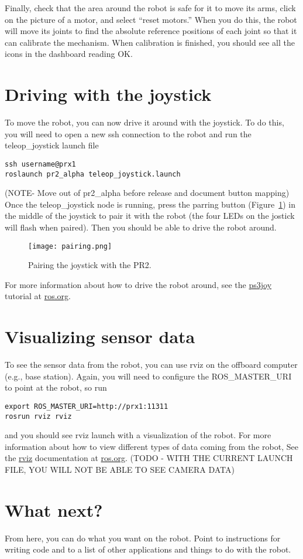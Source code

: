 Finally, check that the area around the robot is safe for it to move its arms, click on the picture of a motor, and select ``reset motors.''  When you do this, the robot will move its joints to find the absolute reference positions of each joint so that it can calibrate the mechanism.  When calibration is finished, you should see all the icons in the dashboard reading OK.
\section{Driving with the joystick}
To move the robot, you can now drive it around with the joystick.  To do this, you will need to open a new ssh connection to the robot and run the teleop\_joystick launch file
\begin{verbatim}
ssh username@prx1
roslaunch pr2_alpha teleop_joystick.launch 
\end{verbatim}
(NOTE- Move out of pr2\_alpha before release and document button mapping)
Once the teleop\_joystick node is running, press the parring button (Figure~\ref{fig:pairing}) in the middle of the joystick to pair it with the robot (the four LEDs on the jostick will flash when paired). Then you should be able to drive the robot around.
\begin{figure}[H]
\centering
\texttt{[image: pairing.png]}
\caption{Pairing the joystick with the PR2.}
\label{fig:pairing}
\end{figure}
For more information about how to drive the robot around, see the 
\href{http://www.ros.org/wiki/ps3joy/Tutorials/UsingJoystickWithPR2}{ps3joy} tutorial at \href{http://www.ros.org}{ros.org}. 

\section{Visualizing sensor data}
To see the sensor data from the robot, you can use rviz on the offboard computer (e.g., base station).  Again, you will need to configure the ROS\_MASTER\_URI to point at the robot, so run
\begin{verbatim}
export ROS_MASTER_URI=http://prx1:11311
rosrun rviz rviz
\end{verbatim}
and you should see rviz launch with a visualization of the robot.  For more information about how to view different types of data coming from the robot, See the \href{http://ros.org/wiki/rviz}{rviz} documentation at \href{http://www.ros.org}{ros.org}.
(TODO - WITH THE CURRENT LAUNCH FILE, YOU WILL NOT BE ABLE TO SEE CAMERA DATA)

\section{What next?}
From here, you can do what you want on the robot.  Point to instructions for writing code and to a list of other applications and things to do with the robot.
